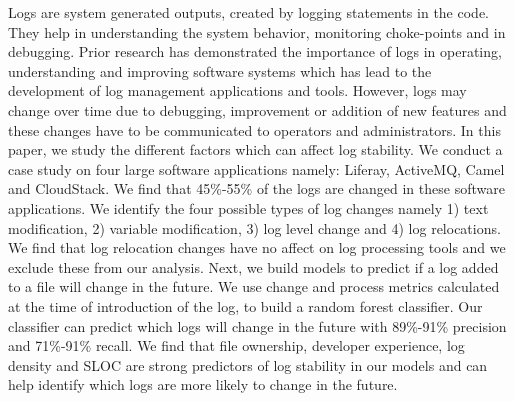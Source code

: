 Logs are system generated outputs, created by logging statements in the code. They help in understanding the system behavior, monitoring choke-points and in debugging. Prior research has demonstrated the importance of logs in operating, understanding and improving software systems which has lead to the development of log management applications and tools. However, logs may change over time due to debugging, improvement or addition of new features and these changes have to be communicated to operators and administrators. In this paper, we study the different factors which can affect log stability. We conduct a case study on four large software applications namely: Liferay, ActiveMQ, Camel and CloudStack. We find that 45\%-55\% of the logs are changed in these software applications. We identify the four possible types of log changes namely 1) text modification, 2) variable modification, 3) log level change and 4) log relocations. We find that log relocation changes have no affect on log processing tools and we exclude these from our analysis. Next, we build models to predict if a log added to a file will change in the future. We use change and process  metrics calculated at the time of introduction of the log, to build a random forest classifier. Our classifier can predict which logs will change in the future with 89\%-91\% precision and 71\%-91\% recall. We find that file ownership, developer experience, log density and SLOC are strong predictors of log stability in our models and can help identify which logs are more likely to change in the future.


